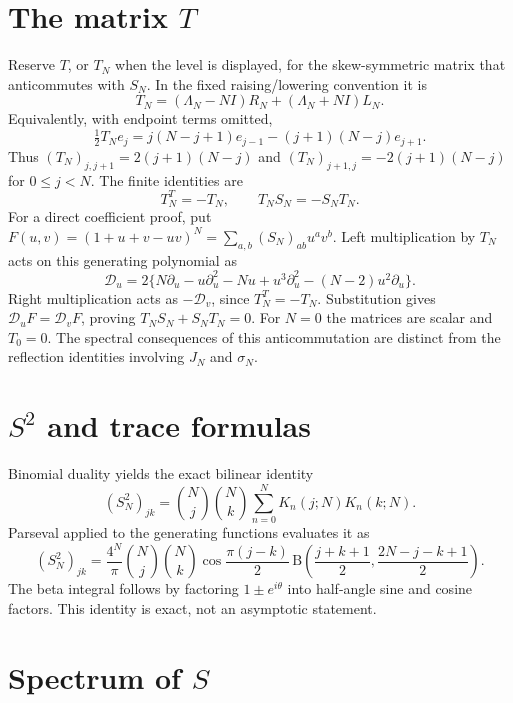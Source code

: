 \section{The matrix $T$}
\label{sec:16-1}
Reserve $T$, or $T_N$ when the level is displayed, for the
skew-symmetric matrix that anticommutes with $S_N$. In the fixed
raising/lowering convention it is
\begin{equation}\label{eq:ency-T-definition}
T_N=(\Lambda_N-NI)R_N+(\Lambda_N+NI)L_N.
\end{equation}
Equivalently, with endpoint terms omitted,
\[
\tfrac12T_Ne_j=j(N-j+1)e_{j-1}-(j+1)(N-j)e_{j+1}.
\]
Thus $(T_N)_{j,j+1}=2(j+1)(N-j)$ and
$(T_N)_{j+1,j}=-2(j+1)(N-j)$ for $0\le j<N$. The finite identities are
\begin{equation}\label{eq:ency-T-anticommutation}
T_N^T=-T_N,\qquad T_NS_N=-S_NT_N.
\end{equation}
For a direct coefficient proof, put
$F(u,v)=(1+u+v-uv)^N=\sum_{a,b}(S_N)_{ab}u^av^b$.
Left multiplication by $T_N$ acts on this generating polynomial as
\[
\mathcal D_u=2\{N\partial_u-u\partial_u^2-Nu
+u^3\partial_u^2-(N-2)u^2\partial_u\}.
\]
Right multiplication acts as $-\mathcal D_v$, since $T_N^T=-T_N$.
Substitution gives $\mathcal D_uF=\mathcal D_vF$, proving
$T_NS_N+S_NT_N=0$. For $N=0$ the matrices are scalar and $T_0=0$.
The spectral consequences of this anticommutation are distinct from
the reflection identities involving $J_N$ and $\sigma_N$.

\section{$S^2$ and trace formulas}
\label{sec:16-2}
Binomial duality yields the exact bilinear identity
\[
(S_N^2)_{jk}=\binom Nj\binom Nk\sum_{n=0}^NK_n(j;N)K_n(k;N).
\]
Parseval applied to the generating functions evaluates it as
\begin{equation}\label{eq:beta}
(S_N^2)_{jk}=\frac{4^N}{\pi}\binom Nj\binom Nk
\cos\frac{\pi(j-k)}2\,
\mathrm B\left(\frac{j+k+1}{2},\frac{2N-j-k+1}{2}\right).
\end{equation}
The beta integral follows by factoring $1\pm e^{i\theta}$ into half-angle sine and cosine factors. This identity is exact, not an asymptotic statement.

\section{Spectrum of $S$}
\label{sec:16-3}


